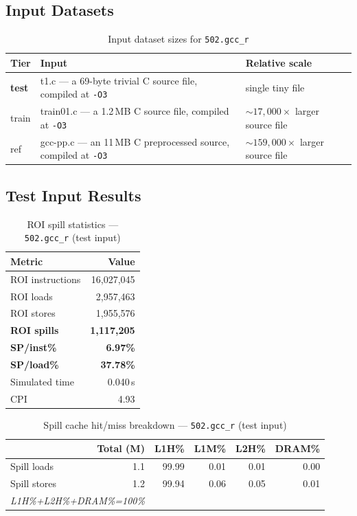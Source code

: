 \documentclass[11pt,a4paper]{article}
\begin{document}
\subsection{Input Datasets}

\begin{table}[H]
\centering
\caption{Input dataset sizes for \texttt{502.gcc\_r}}
\label{tab:gcc_inputs}
\small
\begin{tabular}{lp{8cm}l}
\toprule
\textbf{Tier} & \textbf{Input} & \textbf{Relative scale} \\
\midrule
\textbf{test} & t1.c --- a 69-byte trivial C source file, compiled at \texttt{-O3} & single tiny file \\
train & train01.c --- a 1.2\,MB C source file, compiled at \texttt{-O3} & ${\sim}17{,}000\times$ larger source file \\
ref & gcc-pp.c --- an 11\,MB C preprocessed source, compiled at \texttt{-O3} & ${\sim}159{,}000\times$ larger source file \\
\bottomrule
\end{tabular}
\end{table}

\subsection{Test Input Results}

\begin{table}[H]
\centering
\caption{ROI spill statistics --- \texttt{502.gcc\_r} (test input)}
\label{tab:gcc_test_roi}
\begin{tabular}{lr}
\toprule
\textbf{Metric} & \textbf{Value} \\
\midrule
ROI instructions & 16,027,045 \\
ROI loads        & 2,957,463 \\
ROI stores       & 1,955,576 \\
\textbf{ROI spills}   & \textbf{1,117,205} \\
\textbf{SP/inst\%}   & \textbf{6.97\%} \\
\textbf{SP/load\%}   & \textbf{37.78\%} \\
Simulated time   & 0.040\,s \\
CPI              & 4.93 \\
\bottomrule
\end{tabular}
\end{table}

\begin{table}[H]
\centering
\caption{Spill cache hit/miss breakdown --- \texttt{502.gcc\_r} (test input)}
\label{tab:gcc_test_cache}
\begin{tabular}{lrrrrr}
\toprule
\textbf{} & \textbf{Total (M)} & \textbf{L1H\%} & \textbf{L1M\%} & \textbf{L2H\%} & \textbf{DRAM\%} \\
\midrule
Spill loads  & 1.1 & 99.99 & 0.01 & 0.01 & 0.00 \\
Spill stores & 1.2 & 99.94 & 0.06 & 0.05 & 0.01 \\
\multicolumn{2}{l}{\small\textit{L1H\%+L2H\%+DRAM\%=100\%}} \\
\bottomrule
\end{tabular}
\end{table}
\end{document}
